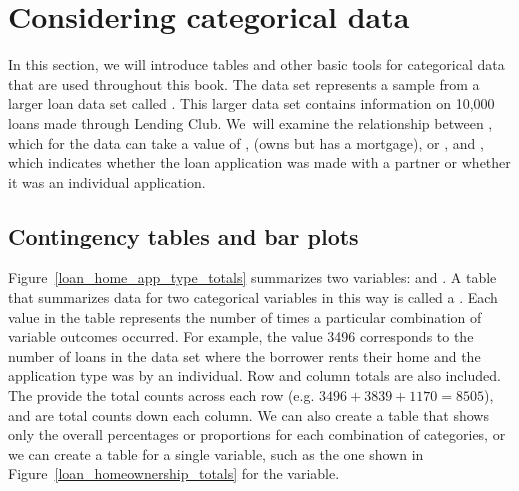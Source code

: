 


\section{Considering categorical data}
\label{categoricalData}


In this section, we will introduce tables and other basic tools
for categorical data that are used throughout this book.
The  data set represents a sample from a larger
loan data set called .
This larger data set contains information on 10,000 loans made
through Lending Club.
We~will examine the relationship between
, which for the  data can take
a value of , 
(owns but has a mortgage), or ,
and ,
which indicates whether the loan application was made
with a partner or whether it was an individual application.


\subsection{Contingency tables and bar plots}

\newcommand{\loanapphomeAA}{3496}
\newcommand{\loanapphomeAB}{3839}
\newcommand{\loanapphomeAC}{1170}
\newcommand{\loanapphomeAD}{8505}
\newcommand{\loanapphomeBA}{362}
\newcommand{\loanapphomeBB}{950}
\newcommand{\loanapphomeBC}{183}
\newcommand{\loanapphomeBD}{1495}
\newcommand{\loanapphomeDA}{3858}
\newcommand{\loanapphomeDAPt}{0.3858} %
\newcommand{\loanapphomeDB}{4789}
\newcommand{\loanapphomeDC}{1353}
\newcommand{\loanapphomeDD}{10000}
\newcommand{\loanapphomeN}{\loanapphomeDD{}}

Figure~\ref{loan_home_app_type_totals} summarizes two variables:
and .
A table that summarizes data for two categorical variables in
this way is called a .
Each value in the table represents the number of times
a particular combination of variable outcomes occurred.
For example, the value \loanapphomeAA{} corresponds to the number of
loans in the data set where the borrower rents their home
and the application type was by an individual.
Row and column totals are also included.
The  
provide the total counts across each row
(e.g. $\loanapphomeAA{} + \loanapphomeAB{} +
  \loanapphomeAC{} = \loanapphomeAD{}$),
and  
are total counts down each column.
We can also create a table that shows only the overall 
percentages or proportions for each combination of categories,
or we can create a table for a single variable,
such as the one shown in Figure~\ref{loan_homeownership_totals}
for the  variable.

